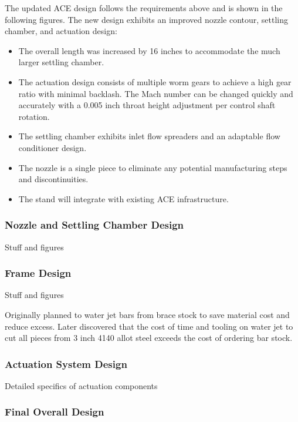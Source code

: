 The updated ACE design follows the requirements above and is shown in the following figures. The new design exhibits an improved nozzle contour, settling chamber, and actuation design:
\begin{itemize}
    \item The overall length was increased by 16 inches to accommodate the much larger settling chamber.
    \item The actuation design consists of multiple worm gears to achieve a high gear ratio with minimal backlash. The Mach number can be changed quickly and accurately with a 0.005 inch throat height adjustment per control shaft rotation.
    \item The settling chamber exhibits inlet flow spreaders and an adaptable flow conditioner design.
    \item The nozzle is a single piece to eliminate any potential manufacturing steps and discontinuities.
    \item The stand will integrate with existing ACE infrastructure.
\end{itemize}

\subsubsection{Nozzle and Settling Chamber Design}

Stuff and figures

\subsubsection{Frame Design}

Stuff and figures

Originally planned to water jet bars from brace stock to save material cost and reduce excess. Later discovered that the cost of time and tooling on water jet to cut all pieces from 3 inch 4140 allot steel exceeds the cost of ordering bar stock.

\subsubsection{Actuation System Design}

Detailed specifics of actuation components

\subsubsection{Final Overall Design}

